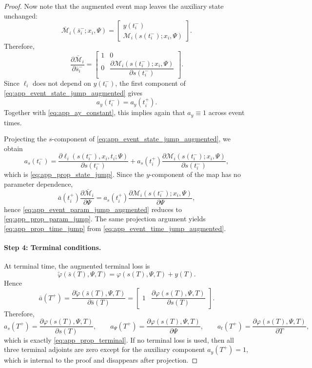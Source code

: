\documentclass[11pt]{article}
\theoremstyle{definition}
\numberwithin{equation}{section}
\numberwithin{theorem}{section}
\numberwithin{proposition}{section}
\numberwithin{lemma}{section}
\numberwithin{corollary}{section}
\numberwithin{definition}{section}
\numberwithin{remark}{section}
\newcommand{\1}{\mathbbm{1}}
\begin{document}
\begin{proof}
Now note that the augmented event map leaves the auxiliary state unchanged:
\[
\bar{\mathcal M}_i(\bar s_i^-;x_i,\Psi)
=
\begin{bmatrix}
y(t_i^-)\\
\mathcal M_i(s(t_i^-);x_i,\Psi)
\end{bmatrix}.
\]
Therefore,
\[
\frac{\partial \bar{\mathcal M}_i}{\partial \bar s_i^-}
=
\begin{bmatrix}
1 & 0\\
0 & \dfrac{\partial \mathcal M_i(s(t_i^-);x_i,\Psi)}{\partial s(t_i^-)}
\end{bmatrix}.
\]
Since $\ell_i$ does not depend on $y(t_i^-)$, the first component of \eqref{eq:app_event_state_jump_augmented} gives
\[
a_y(t_i^-)=a_y(t_i^+).
\]
Together with \eqref{eq:app_ay_constant}, this implies again that $a_y\equiv 1$ across event times.

Projecting the $s$-component of \eqref{eq:app_event_state_jump_augmented}, we obtain
\[
a_s(t_i^-)
=
\frac{\partial \ell_i(s(t_i^-),x_i,t_i;\Psi)}{\partial s(t_i^-)}
+
a_s(t_i^+)
\frac{\partial \mathcal M_i(s(t_i^-);x_i,\Psi)}{\partial s(t_i^-)},
\]
which is \eqref{eq:app_prop_state_jump}. Since the $y$-component of the map has no parameter dependence,
\[
\bar a(t_i^+)\frac{\partial \bar{\mathcal M}_i}{\partial \Psi}
=
a_s(t_i^+)\frac{\partial \mathcal M_i(s(t_i^-);x_i,\Psi)}{\partial \Psi},
\]
hence \eqref{eq:app_event_param_jump_augmented} reduces to \eqref{eq:app_prop_param_jump}. The same projection argument yields \eqref{eq:app_prop_time_jump} from \eqref{eq:app_event_time_jump_augmented}.

\paragraph{Step 4: Terminal conditions.}
At terminal time, the augmented terminal loss is
\[
\tilde \varphi(\bar s(T),\Psi,T)=\varphi(s(T),\Psi,T)+y(T).
\]
Hence
\[
\bar a(T^+)=\frac{\partial \tilde \varphi(\bar s(T),\Psi,T)}{\partial \bar s(T)}
=
\begin{bmatrix}
1 &
\dfrac{\partial \varphi(s(T),\Psi,T)}{\partial s(T)}
\end{bmatrix}.
\]
Therefore,
\[
a_s(T^+)=\frac{\partial \varphi(s(T),\Psi,T)}{\partial s(T)},
\qquad
a_\Psi(T^+)=\frac{\partial \varphi(s(T),\Psi,T)}{\partial \Psi},
\qquad
a_t(T^+)=\frac{\partial \varphi(s(T),\Psi,T)}{\partial T},
\]
which is exactly \eqref{eq:app_prop_terminal}. If no terminal loss is used, then all three terminal adjoints are zero except for the auxiliary component $a_y(T^+)=1$, which is internal to the proof and disappears after projection.


\end{proof}
\end{document}
